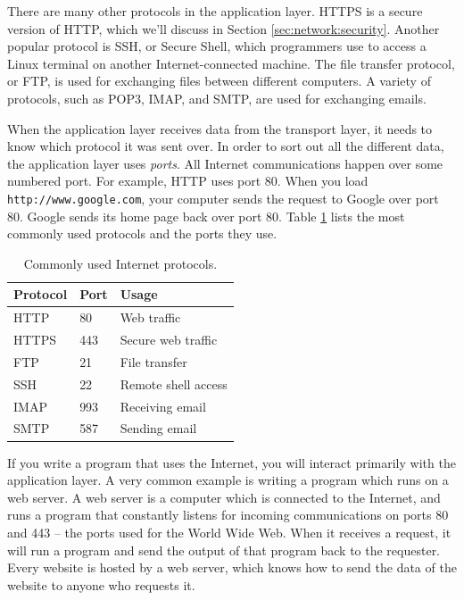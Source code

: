 There are many other protocols in the application layer. HTTPS is a secure version of HTTP, which we'll discuss in Section \ref{sec:network:security}. Another popular protocol is SSH, or Secure Shell, which programmers use to access a Linux terminal on another Internet-connected machine. The file transfer protocol, or FTP, is used for exchanging files between different computers. A variety of protocols, such as POP3, IMAP, and SMTP, are used for exchanging emails.

When the application layer receives data from the transport layer, it needs to know which protocol it was sent over. In order to sort out all the different data, the application layer uses \emph{ports}. All Internet communications happen over some numbered port. For example, HTTP uses port 80. When you load \texttt{http://www.google.com}, your computer sends the request to Google over port 80. Google sends its home page back over port 80. Table \ref{tab:common_ports} lists the most commonly used protocols and the ports they use.

\begin{table}
    \centering
    \begin{tabular}{lll}
        Protocol & Port & Usage \\
        \hline
        HTTP & 80 & Web traffic \\
        HTTPS & 443 & Secure web traffic \\
        FTP & 21 & File transfer \\
        SSH & 22 & Remote shell access \\
        IMAP & 993 & Receiving email \\
        SMTP & 587 & Sending email
    \end{tabular}
    \caption{Commonly used Internet protocols.}
    \label{tab:common_ports}
\end{table}

If you write a program that uses the Internet, you will interact primarily with the application layer. A very common example is writing a program which runs on a web server. A web server is a computer which is connected to the Internet, and runs a program that constantly listens for incoming communications on ports 80 and 443 -- the ports used for the World Wide Web. When it receives a request, it will run a program and send the output of that program back to the requester. Every website is hosted by a web server, which knows how to send the data of the website to anyone who requests it.

